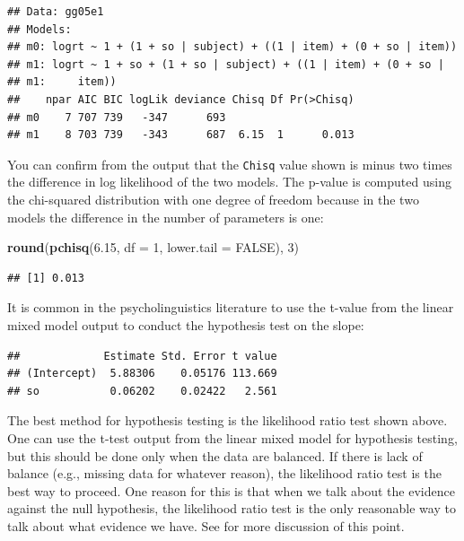 \documentclass[12pt,]{krantz}
\newenvironment{Shaded}{\begin{snugshade}}{\end{snugshade}}
\newcommand{\DataTypeTok}[1]{\textcolor[rgb]{0.13,0.29,0.53}{#1}}
\newcommand{\DecValTok}[1]{\textcolor[rgb]{0.00,0.00,0.81}{#1}}
\newcommand{\FloatTok}[1]{\textcolor[rgb]{0.00,0.00,0.81}{#1}}
\newcommand{\KeywordTok}[1]{\textcolor[rgb]{0.13,0.29,0.53}{\textbf{#1}}}
\newcommand{\NormalTok}[1]{#1}
\newcommand{\OperatorTok}[1]{\textcolor[rgb]{0.81,0.36,0.00}{\textbf{#1}}}
\newcommand{\OtherTok}[1]{\textcolor[rgb]{0.56,0.35,0.01}{#1}}
\begin{document}
\begin{verbatim}
## Data: gg05e1
## Models:
## m0: logrt ~ 1 + (1 + so | subject) + ((1 | item) + (0 + so | item))
## m1: logrt ~ 1 + so + (1 + so | subject) + ((1 | item) + (0 + so | 
## m1:     item))
##    npar AIC BIC logLik deviance Chisq Df Pr(>Chisq)
## m0    7 707 739   -347      693                    
## m1    8 703 739   -343      687  6.15  1      0.013
\end{verbatim}

You can confirm from the output that the \texttt{Chisq} value shown is minus two times the difference in log likelihood of the two models. The p-value is computed using the chi-squared distribution with one degree of freedom because in the two models the difference in the number of parameters is one:

\begin{Shaded}
\begin{Highlighting}[]
\KeywordTok{round}\NormalTok{(}\KeywordTok{pchisq}\NormalTok{(}\FloatTok{6.15}\NormalTok{, }\DataTypeTok{df =} \DecValTok{1}\NormalTok{, }\DataTypeTok{lower.tail =} \OtherTok{FALSE}\NormalTok{), }\DecValTok{3}\NormalTok{)}
\end{Highlighting}
\end{Shaded}

\begin{verbatim}
## [1] 0.013
\end{verbatim}

It is common in the psycholinguistics literature to use the t-value from the linear mixed model output to conduct the hypothesis test on the slope:

\begin{Shaded}
\end{Shaded}

\begin{verbatim}
##             Estimate Std. Error t value
## (Intercept)  5.88306    0.05176 113.669
## so           0.06202    0.02422   2.561
\end{verbatim}

The best method for hypothesis testing is the likelihood ratio test shown above. One can use the t-test output from the linear mixed model for hypothesis testing, but this should be done only when the data are balanced. If there is lack of balance (e.g., missing data for whatever reason), the likelihood ratio test is the best way to proceed. One reason for this is that when we talk about the evidence against the null hypothesis, the likelihood ratio test is the only reasonable way to talk about what evidence we have. See \citet{Royall} for more discussion of this point.
\end{document}
